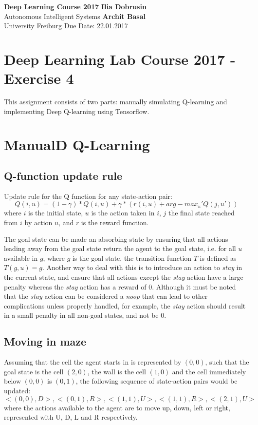 \documentclass[a4paper, 11pt]{article}
\begin{document}
\noindent
\large\textbf{Deep Learning Course 2017} \hfill \textbf{Ilia Dobrusin} \\
 Autonomous Intelligent Systems \hfill \textbf{Archit Basal} \\
 University Freiburg \hfill Due Date: 22.01.2017

\section*{Deep Learning Lab Course 2017 - Exercise 4}
This assignment consists of two parts: manually simulating Q-learning and implementing Deep Q-learning using Tensorflow. 

\section{ManualD Q-Learning}
\subsection*{Q-function update rule}
 Update rule for the Q function for any state-action pair:
 \begin{equation*}
    Q(i, u) = (1 - \gamma) * Q(i, u) + \gamma * (r(i, u) + arg-max_u' Q(j, u'))    
  \end{equation*}
where $i$ is the initial state, $u$ is the action taken in $i$, $j$ the final state reached from $i$ by action $u$, and $r$ is the reward function.


The goal state can be made an absorbing state by ensuring that all actions leading away from the goal state return the agent to the goal state, i.e. for all $u$ available in $g$, where $g$ is the goal state, the transition function $T$ is defined as $T(g, u) = g$. Another way to deal with this is to introduce an action to \textit{stay} in the current state, and ensure that all actions except the \textit{stay} action have a large penalty whereas the \textit{stay} action has a reward of $0$. Although it must be noted that the \textit{stay} action can be considered a \textit{noop} that can lead to other complications unless properly handled, for example, the \textit{stay} action should result in a small penalty in all non-goal states, and not be $0$.

\subsection*{Moving in maze}
Assuming that the cell the agent starts in is represented by $(0,0)$, such that the goal state is the cell $(2,0)$, the wall is the cell $(1,0)$ and the cell immediately below $(0,0)$ is $(0,1)$, the following sequence of state-action pairs would be updated:
\begin{equation*}
<(0,0), D>, <(0,1), R>, <(1,1), U>, <(1,1), R>, <(2,1), U>
\end{equation*}
where the actions available to the agent are to move up, down, left or right, represented with U, D, L and R respectively.
\end{document}
